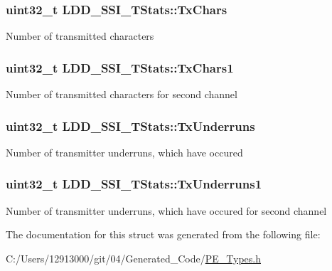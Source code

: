 \subsubsection[{Tx\+Chars}]{\setlength{\rightskip}{0pt plus 5cm}uint32\+\_\+t L\+D\+D\+\_\+\+S\+S\+I\+\_\+\+T\+Stats\+::\+Tx\+Chars}\label{struct_l_d_d___s_s_i___t_stats_abaff1182d41c2c211ce8da947df77bbd}
Number of transmitted characters \hypertarget{struct_l_d_d___s_s_i___t_stats_a0721d681a52cc566e4c89de10e962923}{}
\subsubsection[{Tx\+Chars1}]{\setlength{\rightskip}{0pt plus 5cm}uint32\+\_\+t L\+D\+D\+\_\+\+S\+S\+I\+\_\+\+T\+Stats\+::\+Tx\+Chars1}\label{struct_l_d_d___s_s_i___t_stats_a0721d681a52cc566e4c89de10e962923}
Number of transmitted characters for second channel \hypertarget{struct_l_d_d___s_s_i___t_stats_a5ac8911e76989013a9a4757a90aa5660}{}
\subsubsection[{Tx\+Underruns}]{\setlength{\rightskip}{0pt plus 5cm}uint32\+\_\+t L\+D\+D\+\_\+\+S\+S\+I\+\_\+\+T\+Stats\+::\+Tx\+Underruns}\label{struct_l_d_d___s_s_i___t_stats_a5ac8911e76989013a9a4757a90aa5660}
Number of transmitter underruns, which have occured \hypertarget{struct_l_d_d___s_s_i___t_stats_a14fb329147ead1d214cd25ffd3b39f6d}{}
\subsubsection[{Tx\+Underruns1}]{\setlength{\rightskip}{0pt plus 5cm}uint32\+\_\+t L\+D\+D\+\_\+\+S\+S\+I\+\_\+\+T\+Stats\+::\+Tx\+Underruns1}\label{struct_l_d_d___s_s_i___t_stats_a14fb329147ead1d214cd25ffd3b39f6d}
Number of transmitter underruns, which have occured for second channel 

The documentation for this struct was generated from the following file\+:\begin{DoxyCompactItemize}
\item 
C\+:/\+Users/12913000/git/04/\+Generated\+\_\+\+Code/\hyperlink{_p_e___types_8h}{P\+E\+\_\+\+Types.\+h}\end{DoxyCompactItemize}

